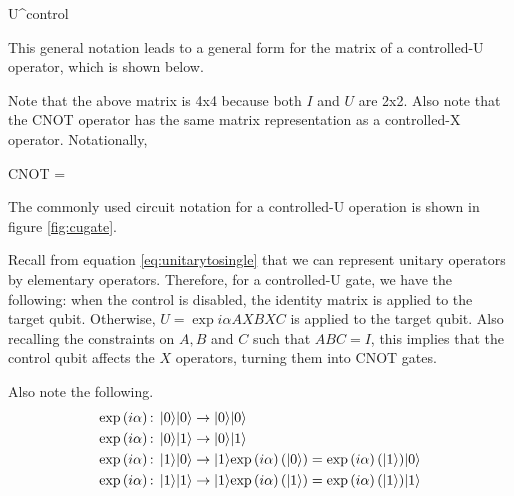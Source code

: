 \beq
{}  \rightarrow {}U^{control}
\eeq

This general notation leads to a general form for the matrix of a controlled-U operator, which is shown below.

\beq
{} \equiv \left[\begin{array}{cc}I & 0\\
0 & U\end{array}\right]
\eeq

Note that the above matrix is 4x4 because both $I$ and $U$ are 2x2. Also note that the \textsc{CNOT} operator has the same matrix representation as a controlled-X operator. Notationally,

\beq
\textsc{CNOT} \equiv {} = \left[\begin{array}{cc}I & 0\\
0 & X\end{array}\right]
\eeq

The commonly used circuit notation for a controlled-U operation is shown in figure \ref{fig:cugate}.


Recall from equation \ref{eq:unitarytosingle} that we can represent unitary operators by elementary operators. Therefore, for a controlled-U gate, we have the following: when the control is disabled, the identity matrix is applied to the target qubit. Otherwise, $U = \exp{i\alpha}AXBXC$ is applied to the target qubit. Also recalling the constraints on $A,B$ and $C$ such that $ABC = I$, this implies that the control qubit affects the $X$ operators, turning them into \textsc{CNOT} gates. 

Also note the following.
\begin{align}
\text{exp}\left(i\alpha\right)\text{: } |0\rangle|0\rangle &\rightarrow |0\rangle|0\rangle\\
\text{exp}\left(i\alpha\right)\text{: } |0\rangle|1\rangle &\rightarrow |0\rangle|1\rangle\\
\text{exp}\left(i\alpha\right)\text{: } |1\rangle|0\rangle &\rightarrow |1\rangle\text{exp}\left(i\alpha\right)(|0\rangle) = \text{exp}\left(i\alpha\right)(|1\rangle)|0\rangle\\
\text{exp}\left(i\alpha\right)\text{: } |1\rangle|1\rangle &\rightarrow |1\rangle\text{exp}\left(i\alpha\right)(|1\rangle) = \text{exp}\left(i\alpha\right)(|1\rangle)|1\rangle
\end{align}

